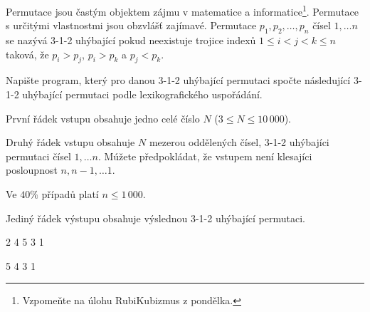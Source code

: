 





Permutace jsou častým objektem zájmu v matematice a informatice\footnote{Vzpomeňte na úlohu RubiKubizmus z pondělka.}.
Permutace s určitými vlastnostmi jsou obzvlášť zajímavé.
Permutace $p_1,p_2, \ldots, p_n$ čísel $1, \ldots n$ se nazývá 3-1-2 uhýbající pokud neexistuje trojice indexů $1\leq i<j<k \leq n$ taková, že $p_i>p_j$,  $p_i>p_k$ a $p_j<p_k$.


Napište program, který pro danou 3-1-2 uhýbající permutaci spočte následující 3-1-2 uhýbající permutaci podle lexikografického uspořádání.


První řádek vstupu obsahuje jedno celé číslo $N$ ($3 \leq N \leq 10\,000$).

Druhý řádek vstupu obsahuje $N$ mezerou oddělených čísel, 3-1-2 uhýbajíci permutaci čísel $1, \ldots n$.
Múžete předpokládat, že vstupem není klesajíci posloupnost $n, n-1, \ldots 1$.

\smallskip

Ve $40\%$ případů platí $n \leq 1\,000$.


Jediný řádek výstupu obsahuje výslednou 3-1-2 uhýbající permutaci.


2 4 5 3 1

 5 4 3 1
\sampleCOMMENT

\sampleEND
\bigskip


